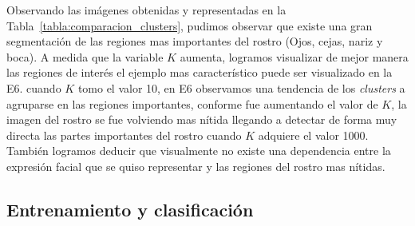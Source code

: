 Observando las imágenes obtenidas y representadas en la Tabla~\ref{tabla:comparacion_clusters}, pudimos observar que existe una gran segmentación de las regiones mas importantes del rostro (Ojos, cejas, nariz y boca). A medida que la variable $K$ aumenta, logramos visualizar de mejor manera las regiones de interés el ejemplo mas característico puede ser visualizado en la E6. \eg cuando $K$ tomo el valor 10, en E6 observamos una tendencia de los \textit{clusters} a agruparse en las regiones importantes, conforme fue aumentando el valor de $K$, la imagen del rostro se fue volviendo mas nítida llegando a detectar de forma muy directa las partes importantes del rostro cuando $K$ adquiere el valor 1000. También logramos deducir que visualmente no existe una dependencia entre la expresión facial que se quiso representar y las regiones del rostro mas nítidas.





\subsection{ Entrenamiento y clasificación }




%
%
%
